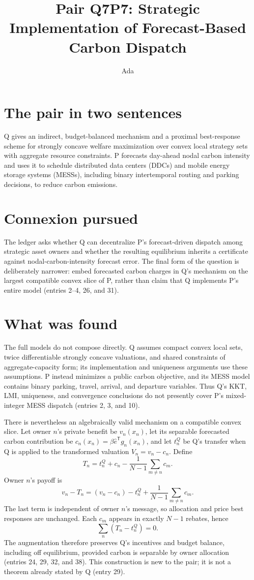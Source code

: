 \documentclass{article}
\title{Pair Q7P7: Strategic Implementation of Forecast-Based Carbon Dispatch}
\author{Ada}
\date{}
\begin{document}
\maketitle

\section*{The pair in two sentences}
Q gives an indirect, budget-balanced mechanism and a proximal best-response
scheme for strongly concave welfare maximization over convex local strategy
sets with aggregate resource constraints.  P forecasts day-ahead nodal carbon
intensity and uses it to schedule distributed data centers (DDCs) and mobile
energy storage systems (MESSs), including binary intertemporal routing and
parking decisions, to reduce carbon emissions.

\section*{Connexion pursued}
The ledger asks whether Q can decentralize P's forecast-driven dispatch among
strategic asset owners and whether the resulting equilibrium inherits a
certificate against nodal-carbon-intensity forecast error.  The final form of
the question is deliberately narrower: embed forecasted carbon charges in Q's
mechanism on the largest compatible convex slice of P, rather than claim that
Q implements P's entire model (entries 2--4, 26, and 31).

\section*{What was found}
The full models do not compose directly.  Q assumes compact convex local sets,
twice differentiable strongly concave valuations, and shared constraints of
aggregate-capacity form; its implementation and uniqueness arguments use
these assumptions.  P instead minimizes a public carbon objective, and its
MESS model contains binary parking, travel, arrival, and departure variables.
Thus Q's KKT, LMI, uniqueness, and convergence conclusions do not presently
cover P's mixed-integer MESS dispatch (entries 2, 3, and 10).

There is nevertheless an algebraically valid mechanism on a compatible convex
slice.  Let owner \(n\)'s private benefit be \(v_n(x_n)\), let its separable
forecasted carbon contribution be
\(c_n(x_n)=\beta\widehat e^{\mathsf T}g_n(x_n)\), and let \(t_n^Q\) be Q's
transfer when Q is applied to the transformed valuation
\(V_n=v_n-c_n\).  Define
\[
 T_n=t_n^Q+c_n-\frac{1}{N-1}\sum_{m\ne n}c_m.
\]
Owner \(n\)'s payoff is
\[
 v_n-T_n=(v_n-c_n)-t_n^Q
 +\frac{1}{N-1}\sum_{m\ne n}c_m.
\]
The last term is independent of owner \(n\)'s message, so allocation and price
best responses are unchanged.  Each \(c_m\) appears in exactly \(N-1\)
rebates, hence
\[
 \sum_n(T_n-t_n^Q)=0.
\]
The augmentation therefore preserves Q's incentives and budget balance,
including off equilibrium, provided carbon is separable by owner allocation
(entries 24, 29, 32, and 38).  This construction is new to the pair; it is not
a theorem already stated by Q (entry 29).
\end{document}
